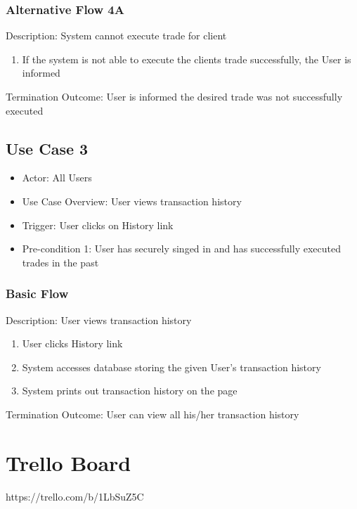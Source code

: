 \documentclass{article}
\begin{document}
\subsubsection{Alternative Flow 4A}
Description: System cannot execute trade for client
\begin{enumerate}
\item If the system is not able to execute the clients trade successfully, the User is informed
\end{enumerate}
Termination Outcome: User is informed the desired trade was not successfully executed

\subsection{Use Case 3}
\begin{itemize}
\item Actor: All Users
\item Use Case Overview:  User views transaction history
\item Trigger: User clicks on History link
\item Pre-condition 1: User has securely singed in and has successfully executed trades in the past
\end{itemize}

\subsubsection{Basic Flow}
Description: User views transaction history
\begin{enumerate}
\item User clicks History link
\item System accesses database storing the given User's transaction history
\item System prints out transaction history on the page 
\end{enumerate}
Termination Outcome: User can view all his/her transaction history

\section{Trello Board}
https://trello.com/b/1LbSuZ5C
\end{document}

